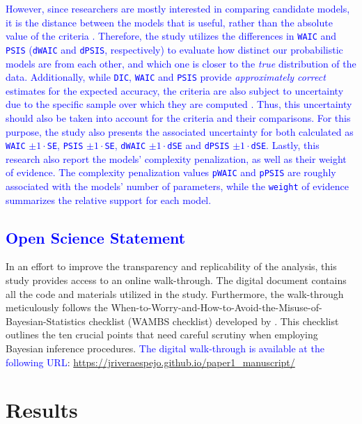 \documentclass[
  authoryear,
  preprint,
  1p]{elsarticle}
\begin{document}
\textcolor{blue}{However, since researchers are mostly interested in comparing candidate
models, it is the distance between the models that is useful, rather
than the absolute value of the criteria \citep[see][pp.~209,
223-224]{McElreath_2020}. Therefore, the study utilizes the differences
in \texttt{WAIC} and \texttt{PSIS} (\texttt{dWAIC} and \texttt{dPSIS},
respectively) to evaluate how distinct our probabilistic models are from
each other, and which one is closer to the \emph{true} distribution of
the data. Additionally, while \texttt{DIC}, \texttt{WAIC} and
\texttt{PSIS} provide \emph{approximately correct} estimates for the
expected accuracy, the criteria are also subject to uncertainty due to
the specific sample over which they are computed
\citep[see][pp.~223]{McElreath_2020}. Thus, this uncertainty should also
be taken into account for the criteria and their comparisons. For this
purpose, the study also presents the associated uncertainty for both
calculated as \texttt{WAIC} \(\pm 1 \cdot\)\texttt{SE}, \texttt{PSIS}
\(\pm 1 \cdot\)\texttt{SE}, \texttt{dWAIC} \(\pm 1 \cdot\)\texttt{dSE}
and \texttt{dPSIS} \(\pm 1 \cdot\)\texttt{dSE}. Lastly, this research
also report the models' complexity penalization, as well as their weight
of evidence. The complexity penalization values \texttt{pWAIC} and
\texttt{pPSIS} are roughly associated with the models' number of
parameters, while the \texttt{weight} of evidence summarizes the
relative support for each model.}

\subsection{\textcolor{blue}{Open Science Statement}}\label{sec-M-SM-OS}

In an effort to improve the transparency and replicability of the
analysis, this study provides access to an online walk-through. The
digital document contains all the code and materials utilized in the
study. Furthermore, the walk-through meticulously follows the
When-to-Worry-and-How-to-Avoid-the-Misuse-of-Bayesian-Statistics
checklist (WAMBS checklist) developed by \citet{Depaoli_et_al_2017}.
This checklist outlines the ten crucial points that need careful
scrutiny when employing Bayesian inference procedures. \textcolor{blue}{The digital
walk-through is available at the following URL}:
\url{https://jriveraespejo.github.io/paper1_manuscript/}

\section{Results}\label{sec-results}
\end{document}
